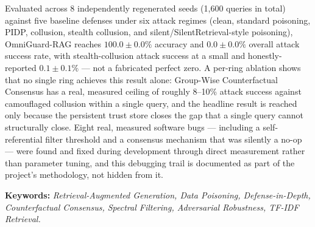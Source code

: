 \vspace{0.6em}
Evaluated across 8 independently regenerated seeds (1,600 queries in
total) against five baseline defenses under six attack regimes (clean,
standard poisoning, PIDP, collusion, stealth collusion, and
silent/SilentRetrieval-style poisoning), OmniGuard-RAG reaches
$100.0\pm0.0\%$ accuracy and $0.0\pm0.0\%$ overall attack success rate,
with stealth-collusion attack success at a small and honestly-reported
$0.1\pm0.1\%$ --- not a fabricated perfect zero. A per-ring ablation shows
that no single ring achieves this result alone: Group-Wise Counterfactual
Consensus has a real, measured ceiling of roughly 8--10\% attack success
against camouflaged collusion within a single query, and the headline
result is reached only because the persistent trust store closes the gap
that a single query cannot structurally close. Eight real, measured
software bugs --- including a self-referential filter threshold and a
consensus mechanism that was silently a no-op --- were found and fixed
during development through direct measurement rather than parameter
tuning, and this debugging trail is documented as part of the project's
methodology, not hidden from it.

\vspace{0.8em}
\noindent\textbf{\color{navy}Keywords:} \textit{Retrieval-Augmented
Generation, Data Poisoning, Defense-in-Depth, Counterfactual Consensus,
Spectral Filtering, Adversarial Robustness, TF-IDF Retrieval.}
